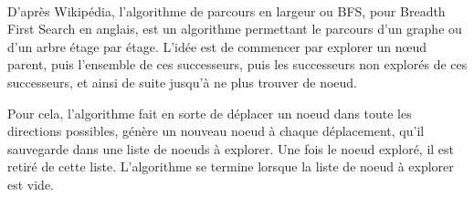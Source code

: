 \documentclass[a4paper, 12pt]{article}
\begin{document}
            \paragraph{}
            D'après Wikipédia\cite{bfs}, l'algorithme de parcours en largeur ou BFS, pour Breadth First Search en anglais, est un algorithme permettant le parcours d'un graphe ou d'un arbre étage par étage. L'idée est de commencer par explorer un nœud parent, puis l'ensemble de ces successeurs, puis les successeurs non explorés de ces successeurs, et ainsi de suite jusqu'à ne plus trouver de noeud.
            
            Pour cela, l'algorithme fait en sorte de déplacer un noeud dans toute les directions possibles, génère un nouveau noeud à chaque déplacement, qu'il sauvegarde dans une liste de noeuds à explorer. Une fois le noeud exploré, il est retiré de cette liste. L'algorithme se termine lorsque la liste de noeud à explorer est vide.
\end{document}
